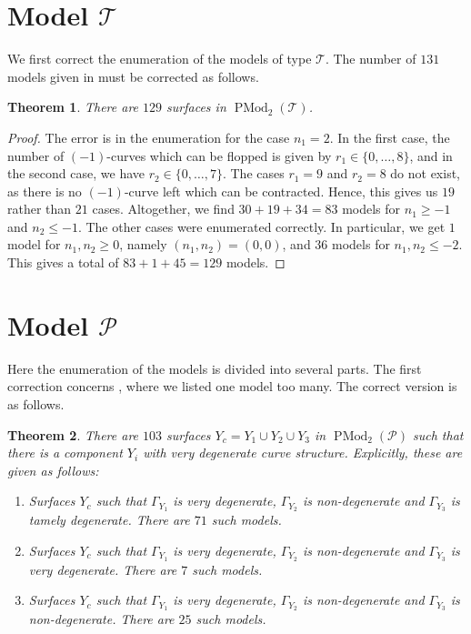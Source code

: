 \documentclass[11pt]{amsart}
\numberwithin{equation}{section}
\theoremstyle{plain}
\newtheorem{theorem}{Theorem}[section]
\theoremstyle{remark}
\newcommand{\PMod}{\operatorname{PMod}}
\newcommand{\T}{\mathscr{T}\!}
\begin{document}
\section{Model \texorpdfstring{$\boldsymbol{\mathscr{T}}$}{T}}

We first correct the enumeration of the models of type $\T$. The number of $131$ models given in \cite[Theorem 7.7]{HL22} must be corrected as follows. 

\begin{theorem}\label{modelsT}  There are $129$ surfaces in $\PMod_2(\mathscr{T})$.
\end{theorem}

\begin{proof}
The error is in the enumeration for the case $n_1=2$. In the first case, the number of $(-1)$-curves which can be flopped is given by $r_1 \in \{0,\ldots,8\}$, and in the second case, we have $r_2 \in \{0,\ldots,7\}$. The cases $r_1=9$ and $r_2=8$ do not exist, as there is no $(-1)$-curve left which can be contracted. Hence, this gives us $19$ rather than $21$ cases. Altogether, we find $30+19+34 = 83$ models for $n_1 \geq -1$ and $n_2 \leq -1$. The other cases were enumerated correctly. In particular, we get $1$ model for $n_1,n_2 \geq 0$, namely $(n_1,n_2)=(0,0)$, and $36$ models for $n_1,n_2 \leq -2$.  This gives a total of $83 + 1 + 45=129$ models.
\end{proof}


\section{Model \texorpdfstring{$\boldsymbol{\mathscr{P}}$}{P}}

Here the enumeration of the models is divided into several parts. The first correction concerns \cite[Theorem 7.8(ii)]{HL22}, where we listed one model too many. The correct version is as follows. 

\begin{theorem}\label{modelsP}
There are $103$ surfaces $Y_c=Y_1\cup Y_2 \cup Y_3 $ in $\PMod_2(\mathscr{P})$ such that there is a component $Y_i$ with very degenerate curve structure. Explicitly, these are given as follows:
\begin{enumerate}
\item\label{modelsP-1} Surfaces $Y_c$ such that $\Gamma_{Y_1}$ is very degenerate, $\Gamma_{Y_2}$ is non-degenerate and $\Gamma_{Y_3}$ is tamely degenerate. There are $71$ such models.
\item\label{modelsP-2} Surfaces $Y_c$ such that $\Gamma_{Y_1}$ is very degenerate, $\Gamma_{Y_2}$ is non-degenerate and $\Gamma_{Y_3}$ is very degenerate. There are $7$ such models.
\item\label{modelsP-3} Surfaces $Y_c$ such that $\Gamma_{Y_1}$ is very degenerate, $\Gamma_{Y_2}$ is non-degenerate and $\Gamma_{Y_3}$ is non-degenerate. There are $25$ such models.
\end{enumerate}
\end{theorem}
\end{document}
